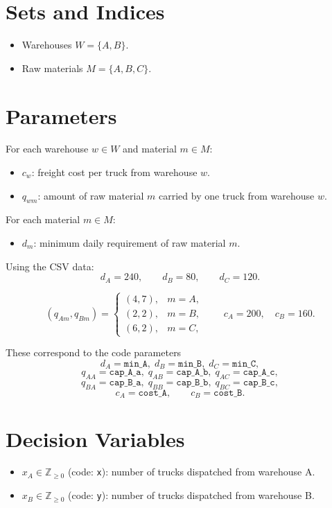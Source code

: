\section*{Sets and Indices}

\begin{itemize}
    \item Warehouses $W=\{A,B\}$.
    \item Raw materials $M=\{A,B,C\}$.
\end{itemize}

\section*{Parameters}

For each warehouse $w \in W$ and material $m \in M$:
\begin{itemize}
    \item $c_w$: freight cost per truck from warehouse $w$.
    \item $q_{wm}$: amount of raw material $m$ carried by one truck from warehouse $w$.
\end{itemize}

For each material $m \in M$:
\begin{itemize}
    \item $d_m$: minimum daily requirement of raw material $m$.
\end{itemize}

Using the CSV data:
\[
d_A=240,\qquad d_B=80,\qquad d_C=120.
\]

\[
(q_{Am},q_{Bm})=
\begin{cases}
(4,7), & m=A,\\
(2,2), & m=B,\\
(6,2), & m=C,
\end{cases}
\qquad
c_A=200,\quad c_B=160.
\]

These correspond to the code parameters
\[
d_A=\texttt{min\_A},\;
d_B=\texttt{min\_B},\;
d_C=\texttt{min\_C},
\]
\[
q_{AA}=\texttt{cap\_A\_a},\;
q_{AB}=\texttt{cap\_A\_b},\;
q_{AC}=\texttt{cap\_A\_c},
\]
\[
q_{BA}=\texttt{cap\_B\_a},\;
q_{BB}=\texttt{cap\_B\_b},\;
q_{BC}=\texttt{cap\_B\_c},
\]
\[
c_A=\texttt{cost\_A},\qquad c_B=\texttt{cost\_B}.
\]

\section*{Decision Variables}

\begin{itemize}
    \item $x_A \in \mathbb{Z}_{\ge 0}$ (code: \texttt{x}): number of trucks dispatched from warehouse A.
    \item $x_B \in \mathbb{Z}_{\ge 0}$ (code: \texttt{y}): number of trucks dispatched from warehouse B.
\end{itemize}

